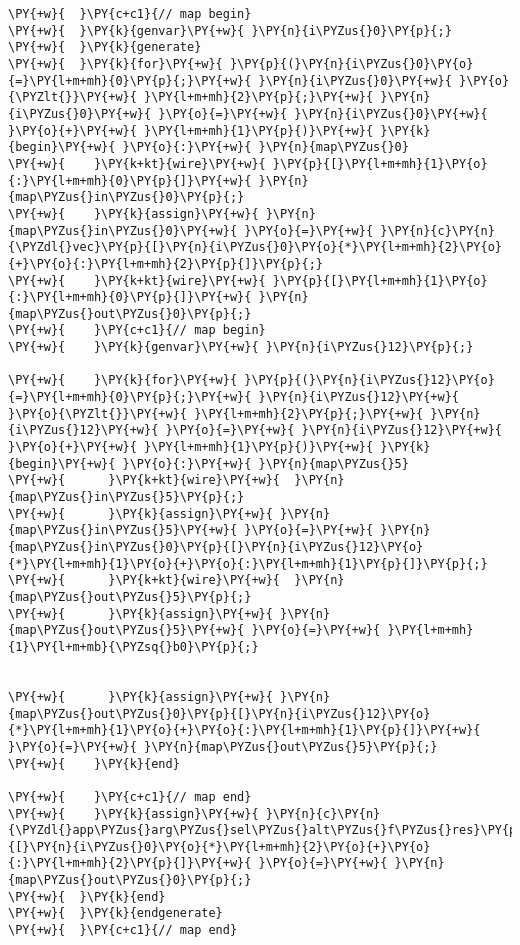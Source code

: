{\begin{Verbatim}[commandchars=\\\{\}]
\PY{+w}{  }\PY{c+c1}{// map begin}
\PY{+w}{  }\PY{k}{genvar}\PY{+w}{ }\PY{n}{i\PYZus{}0}\PY{p}{;}
\PY{+w}{  }\PY{k}{generate}
\PY{+w}{  }\PY{k}{for}\PY{+w}{ }\PY{p}{(}\PY{n}{i\PYZus{}0}\PY{o}{=}\PY{l+m+mh}{0}\PY{p}{;}\PY{+w}{ }\PY{n}{i\PYZus{}0}\PY{+w}{ }\PY{o}{\PYZlt{}}\PY{+w}{ }\PY{l+m+mh}{2}\PY{p}{;}\PY{+w}{ }\PY{n}{i\PYZus{}0}\PY{+w}{ }\PY{o}{=}\PY{+w}{ }\PY{n}{i\PYZus{}0}\PY{+w}{ }\PY{o}{+}\PY{+w}{ }\PY{l+m+mh}{1}\PY{p}{)}\PY{+w}{ }\PY{k}{begin}\PY{+w}{ }\PY{o}{:}\PY{+w}{ }\PY{n}{map\PYZus{}0}
\PY{+w}{    }\PY{k+kt}{wire}\PY{+w}{ }\PY{p}{[}\PY{l+m+mh}{1}\PY{o}{:}\PY{l+m+mh}{0}\PY{p}{]}\PY{+w}{ }\PY{n}{map\PYZus{}in\PYZus{}0}\PY{p}{;}
\PY{+w}{    }\PY{k}{assign}\PY{+w}{ }\PY{n}{map\PYZus{}in\PYZus{}0}\PY{+w}{ }\PY{o}{=}\PY{+w}{ }\PY{n}{c}\PY{n}{\PYZdl{}vec}\PY{p}{[}\PY{n}{i\PYZus{}0}\PY{o}{*}\PY{l+m+mh}{2}\PY{o}{+}\PY{o}{:}\PY{l+m+mh}{2}\PY{p}{]}\PY{p}{;}
\PY{+w}{    }\PY{k+kt}{wire}\PY{+w}{ }\PY{p}{[}\PY{l+m+mh}{1}\PY{o}{:}\PY{l+m+mh}{0}\PY{p}{]}\PY{+w}{ }\PY{n}{map\PYZus{}out\PYZus{}0}\PY{p}{;}
\PY{+w}{    }\PY{c+c1}{// map begin}
\PY{+w}{    }\PY{k}{genvar}\PY{+w}{ }\PY{n}{i\PYZus{}12}\PY{p}{;}

\PY{+w}{    }\PY{k}{for}\PY{+w}{ }\PY{p}{(}\PY{n}{i\PYZus{}12}\PY{o}{=}\PY{l+m+mh}{0}\PY{p}{;}\PY{+w}{ }\PY{n}{i\PYZus{}12}\PY{+w}{ }\PY{o}{\PYZlt{}}\PY{+w}{ }\PY{l+m+mh}{2}\PY{p}{;}\PY{+w}{ }\PY{n}{i\PYZus{}12}\PY{+w}{ }\PY{o}{=}\PY{+w}{ }\PY{n}{i\PYZus{}12}\PY{+w}{ }\PY{o}{+}\PY{+w}{ }\PY{l+m+mh}{1}\PY{p}{)}\PY{+w}{ }\PY{k}{begin}\PY{+w}{ }\PY{o}{:}\PY{+w}{ }\PY{n}{map\PYZus{}5}
\PY{+w}{      }\PY{k+kt}{wire}\PY{+w}{  }\PY{n}{map\PYZus{}in\PYZus{}5}\PY{p}{;}
\PY{+w}{      }\PY{k}{assign}\PY{+w}{ }\PY{n}{map\PYZus{}in\PYZus{}5}\PY{+w}{ }\PY{o}{=}\PY{+w}{ }\PY{n}{map\PYZus{}in\PYZus{}0}\PY{p}{[}\PY{n}{i\PYZus{}12}\PY{o}{*}\PY{l+m+mh}{1}\PY{o}{+}\PY{o}{:}\PY{l+m+mh}{1}\PY{p}{]}\PY{p}{;}
\PY{+w}{      }\PY{k+kt}{wire}\PY{+w}{  }\PY{n}{map\PYZus{}out\PYZus{}5}\PY{p}{;}
\PY{+w}{      }\PY{k}{assign}\PY{+w}{ }\PY{n}{map\PYZus{}out\PYZus{}5}\PY{+w}{ }\PY{o}{=}\PY{+w}{ }\PY{l+m+mh}{1}\PY{l+m+mb}{\PYZsq{}b0}\PY{p}{;}


\PY{+w}{      }\PY{k}{assign}\PY{+w}{ }\PY{n}{map\PYZus{}out\PYZus{}0}\PY{p}{[}\PY{n}{i\PYZus{}12}\PY{o}{*}\PY{l+m+mh}{1}\PY{o}{+}\PY{o}{:}\PY{l+m+mh}{1}\PY{p}{]}\PY{+w}{ }\PY{o}{=}\PY{+w}{ }\PY{n}{map\PYZus{}out\PYZus{}5}\PY{p}{;}
\PY{+w}{    }\PY{k}{end}

\PY{+w}{    }\PY{c+c1}{// map end}
\PY{+w}{    }\PY{k}{assign}\PY{+w}{ }\PY{n}{c}\PY{n}{\PYZdl{}app\PYZus{}arg\PYZus{}sel\PYZus{}alt\PYZus{}f\PYZus{}res}\PY{p}{[}\PY{n}{i\PYZus{}0}\PY{o}{*}\PY{l+m+mh}{2}\PY{o}{+}\PY{o}{:}\PY{l+m+mh}{2}\PY{p}{]}\PY{+w}{ }\PY{o}{=}\PY{+w}{ }\PY{n}{map\PYZus{}out\PYZus{}0}\PY{p}{;}
\PY{+w}{  }\PY{k}{end}
\PY{+w}{  }\PY{k}{endgenerate}
\PY{+w}{  }\PY{c+c1}{// map end}


\end{Verbatim}}
